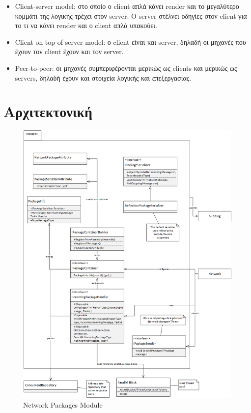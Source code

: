 \documentclass[oneside, 12pt]{book}
\begin{document}
		\begin{itemize}	
			\item Client-server model: στο οποίο ο client απλά κάνει render και το μεγαλύτερο κομμάτι της λογικής τρέχει στον server. Ο server στέλνει οδηγίες στον client για το τι να κάνει render και ο client απλά υπακούει.
			\item Client on top of server model: ο client είναι και server, δηλαδή οι μηχανές που έχουν τον client έχουν και τον server.
			\item Peer-to-peer: οι μηχανές συμπεριφέρονται μερικώς ως clients και μερικώς ως servers, δηλαδή έχουν και στοιχεία λογικής και επεξεργασίας.
		\end{itemize}
			
		\section{Αρχιτεκτονική}		
			\begin{figure}[h]
				\centering
				\includegraphics[width=165mm]{Images/network_architecture_packages}
				\caption{Network Packages Module}
				\label{network_packages}
			\end{figure}
			
\end{document}
